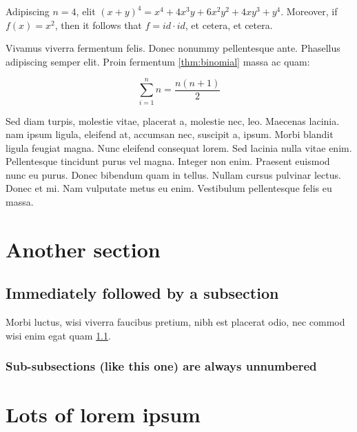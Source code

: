 \documentclass{rntz}
\begin{document}
\begin{corollary} Adipiscing $n=4$, elit
  \( (x+y)^4 = x^4 + 4x^3y + 6x^2y^2 + 4xy^3 + y^4 \). Moreover, if $f(x) =
  x^2$, then it follows that $f = \mathit{id} \cdot \mathit{id}$, et cetera, et
  cetera.
\end{corollary}

Vivamus viverra fermentum felis. Donec nonummy pellentesque ante. Pha\-sellus
adipiscing semper elit. Proin fermentum \cref{thm:binomial} massa ac quam:

\[ \sum_{i=1}^n n = \frac{n(n+1)}{2} \]


Sed diam turpis, molestie vitae, placerat a, molestie nec, leo. Maecenas
lacinia.  nam ipsum ligula, eleifend at, accumsan nec, suscipit a,
ipsum. Morbi blandit ligula feugiat magna. Nunc eleifend consequat lorem. Sed
lacinia nulla vitae enim. Pellentesque tincidunt purus vel magna. Integer non
enim. Praesent euismod nunc eu purus. Donec bibendum quam in tellus. Nullam
cursus pulvinar lectus. Donec et mi. Nam vulputate metus eu enim. Vestibulum
pellentesque felis eu massa.

\section{Another section}\label{sec:two}
\subsection{Immediately followed by a subsection}\label{sec:two-one}

\lipsum[6]

\begin{conjecture}
  Morbi luctus, wisi viverra faucibus pretium, nibh est placerat odio, nec
  commod wisi enim egat quam \cref{sec:two-one}.
\end{conjecture}

\subsubsection{Sub-subsections (like this one) are always unnumbered}

\lipsum[7-8]


\section{Lots of lorem ipsum}
\lipsum\lipsum[1]\lipsum\lipsum[2]\lipsum\lipsum[3]\lipsum\lipsum[4]
\lipsum\lipsum[5]\lipsum\lipsum[6]\lipsum\lipsum[7]\lipsum\lipsum[8]
\lipsum\lipsum[1]\lipsum\lipsum[2]\lipsum\lipsum[3]\lipsum\lipsum[4]
\lipsum\lipsum[5]\lipsum\lipsum[6]\lipsum\lipsum[7]\lipsum\lipsum[8]
\end{document}
